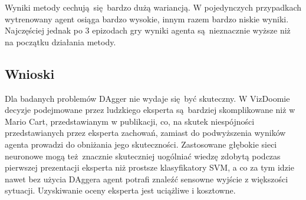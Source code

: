 Wyniki metody cechują się bardzo dużą wariancją. W pojedynczych przypadkach wytrenowany agent osiąga bardzo wysokie, innym razem bardzo niskie wyniki. Najczęściej jednak po 3 epizodach gry wyniki agenta są nieznacznie wyższe niż na początku działania metody.

\subsection{Wnioski}
Dla badanych problemów DAgger nie wydaje się być skuteczny. W VizDoomie decyzje podejmowane przez ludzkiego eksperta są bardziej skomplikowane niż w Mario Cart, przedstawianym w publikacji, co, na skutek niespójności przedstawianych przez eksperta zachowań, zamiast do podwyższenia wyników agenta prowadzi do obniżania jego skuteczności. Zastosowane głębokie sieci neuronowe mogą też znacznie skuteczniej uogólniać wiedzę zdobytą podczas pierwszej prezentacji eksperta niż prostsze klasyfikatory SVM, a co za tym idzie nawet bez użycia DAggera agent potrafi znaleźć sensowne wyjście z większości sytuacji. Uzyskiwanie oceny eksperta jest uciążliwe i kosztowne.

